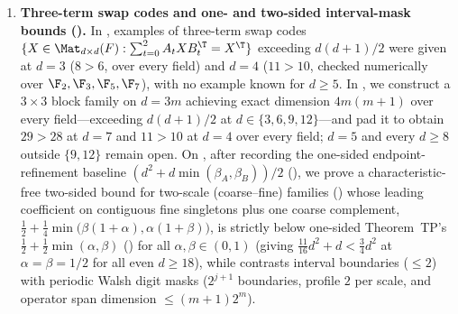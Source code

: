\begin{enumerate}[label=\arabic*.]
\item \textbf{Three-term swap codes and one- and two-sided interval-mask bounds ().}
  In \cite[Remark~5.6]{SeventeenthPaper2026}, examples of three-term swap codes
  $\{X \in \Mat_{d\times d}(F) : \sum_{t=0}^2 A_t X B_t^{\T} = X^{\T}\}$ exceeding $d(d+1)/2$ were
  given at $d = 3$ ($8 > 6$, over every field) and $d = 4$ ($11 > 10$, checked numerically over
  $\F_2, \F_3, \F_5, \F_7$), with no example known for $d \ge 5$. In
  , we construct a $3 \times 3$ block family
  on $d = 3m$ achieving exact dimension $4m(m+1)$ over every field---exceeding $d(d+1)/2$ at
  $d \in \{3, 6, 9, 12\}$---and pad it to obtain $29 > 28$ at $d = 7$ and $11 > 10$ at $d = 4$ over
  every field; $d = 5$ and every $d \ge 8$ outside $\{9, 12\}$ remain open. On
  \cite[Problem~9.3]{SeventeenthPaper2026}, after recording the one-sided endpoint-refinement baseline
  $(d^2 + d\min(\beta_A, \beta_B))/2$ (), we prove a
  characteristic-free two-sided bound for two-scale (coarse--fine) families
  () whose leading coefficient on contiguous fine
  singletons plus one coarse complement,
  $\frac{1}{2} + \frac{1}{4}\min\bigl(\beta(1+\alpha),\alpha(1+\beta)\bigr)$, is strictly below
  one-sided Theorem~TP's $\frac{1}{2} + \frac{1}{2}\min(\alpha,\beta)$
  (\cite[Theorem~6.4]{SeventeenthPaper2026}) for all $\alpha, \beta \in (0,1)$ (giving
  $\frac{11}{16}d^2 + d < \frac{3}{4}d^2$ at $\alpha = \beta = 1/2$ for all even $d \ge 18$), while
   contrasts interval boundaries ($\le 2$) with periodic Walsh digit masks
  ($2^{j+1}$ boundaries, profile $2$ per scale, and operator span dimension $\le (m+1)2^m$).


\end{enumerate}
